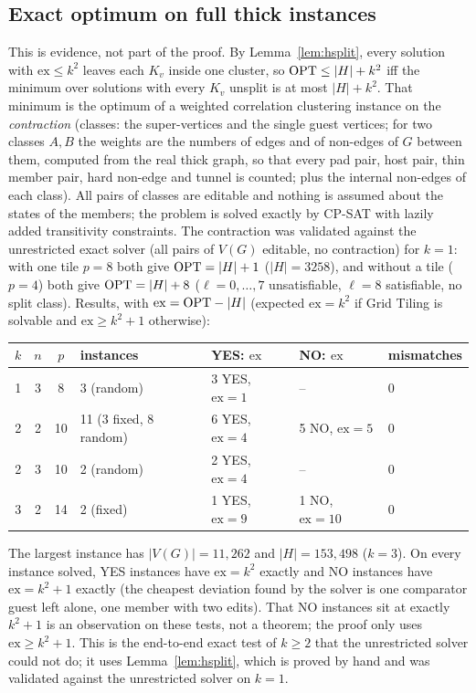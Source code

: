 \subsection{Exact optimum on full thick instances}\label{sec:hexact}
This is evidence, not part of the proof. By Lemma~\ref{lem:hsplit}, every solution with $\mathrm{ex}\le k^2$ leaves each $K_v$ inside one cluster, so $\mathrm{OPT}\le|H|+k^2$ iff the minimum over solutions with every $K_v$ unsplit is at most $|H|+k^2$. That minimum is the optimum of a weighted correlation clustering instance on the \emph{contraction} (classes: the super-vertices and the single guest vertices; for two classes $A,B$ the weights are the numbers of edges and of non-edges of $G$ between them, computed from the real thick graph, so that every pad pair, host pair, thin member pair, hard non-edge and tunnel is counted; plus the internal non-edges of each class). All pairs of classes are editable and nothing is assumed about the states of the members; the problem is solved exactly by CP-SAT with lazily added transitivity constraints. The contraction was validated against the unrestricted exact solver (all pairs of $V(G)$ editable, no contraction) for $k=1$: with one tile $p=8$ both give $\mathrm{OPT}=|H|+1$ ($|H|=3258$), and without a tile ($p=4$) both give $\mathrm{OPT}=|H|+8$ ($\ell=0,\dots,7$ unsatisfiable, $\ell=8$ satisfiable, no split class). Results, with $\mathrm{ex}=\mathrm{OPT}-|H|$ (expected $\mathrm{ex}=k^2$ if Grid Tiling is solvable and $\mathrm{ex}\ge k^2+1$ otherwise):
\begin{center}
\small
\begin{tabular}{@{}cccllll@{}}
\hline
$k$ & $n$ & $p$ & instances & YES: $\mathrm{ex}$ & NO: $\mathrm{ex}$ & mismatches\\\hline
1 & 3 & 8 & 3 (random) & 3 YES, $\mathrm{ex}=1$ & -- & 0\\
2 & 2 & 10 & 11 (3 fixed, 8 random) & 6 YES, $\mathrm{ex}=4$ & 5 NO, $\mathrm{ex}=5$ & 0\\
2 & 3 & 10 & 2 (random) & 2 YES, $\mathrm{ex}=4$ & -- & 0\\
3 & 2 & 14 & 2 (fixed) & 1 YES, $\mathrm{ex}=9$ & 1 NO, $\mathrm{ex}=10$ & 0\\\hline
\end{tabular}
\end{center}
The largest instance has $|V(G)|=11{,}262$ and $|H|=153{,}498$ ($k=3$). On every instance solved, YES instances have $\mathrm{ex}=k^2$ exactly and NO instances have $\mathrm{ex}=k^2+1$ exactly (the cheapest deviation found by the solver is one comparator guest left alone, one member with two edits). That NO instances sit at exactly $k^2+1$ is an observation on these tests, not a theorem; the proof only uses $\mathrm{ex}\ge k^2+1$. This is the end-to-end exact test of $k\ge2$ that the unrestricted solver could not do; it uses Lemma~\ref{lem:hsplit}, which is proved by hand and was validated against the unrestricted solver on $k=1$.

